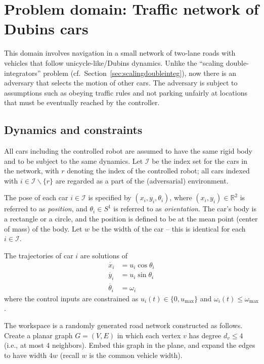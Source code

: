 \documentclass[12pt]{amsart}
\theoremstyle{definition}
\begin{document}
\section{Problem domain: Traffic network of Dubins cars}\label{sec:trafficdubins}

This domain involves navigation in a small network of two-lane roads with
vehicles that follow unicycle-like/Dubins dynamics. Unlike the ``scaling
double-integrators'' problem (cf.\ Section~\ref{sec:scalingdoubleinteg}), now
there is an adversary that selects the motion of other cars.  The adversary is
subject to assumptions such as obeying traffic rules and not parking unfairly at
locations that must be eventually reached by the controller.

\subsection{Dynamics and constraints}
All cars including the controlled robot are assumed to have the same rigid body and to be subject to
the same dynamics. Let $\mathcal I$ be the index set for the cars in the network, with $r$ denoting the index of the controlled robot; all cars indexed with $i \in {\mathcal I}\backslash\{r\}$ are regarded as a part of the (adversarial) environment. 

The pose of each car $i \in {\mathcal I}$ is specified by $(x_i,y_i,\theta_i)$, where $(x_i,y_i)\in
\mathbb{R}^2$ is referred to as \textit{position}, and $\theta_i \in S^1$ is
referred to as \textit{orientation}.  The car's body is a rectangle or a circle,
and the position is defined to be at the mean point (center of mass) of the
body.  Let $w$ be the width of the car -- this is identical for each $i \in {\mathcal I}$.  

The trajectories of car $i$ are solutions of
\begin{align*}
\dot{x_i} &= u_i \cos \theta_i \\
\dot{y_i} &= u_i \sin \theta_i \\
\dot{\theta_i} &= \omega_i
\end{align*}
where the control inputs are constrained as $u_i(t)\in \{0,u_{\mathrm{max}}\}$ and
$\omega_i(t) \leq \omega_{\mathrm{max}}$.


The workspace is a randomly generated road network constructed as follows.
Create a planar graph $G = (V,E)$ in which each vertex $v$ has degree $d_v \le 4$ (i.e., at most 4
neighbors).  Embed this graph in the plane, and expand the edges to have width
$4w$ (recall $w$ is the common vehicle width).
\end{document}
